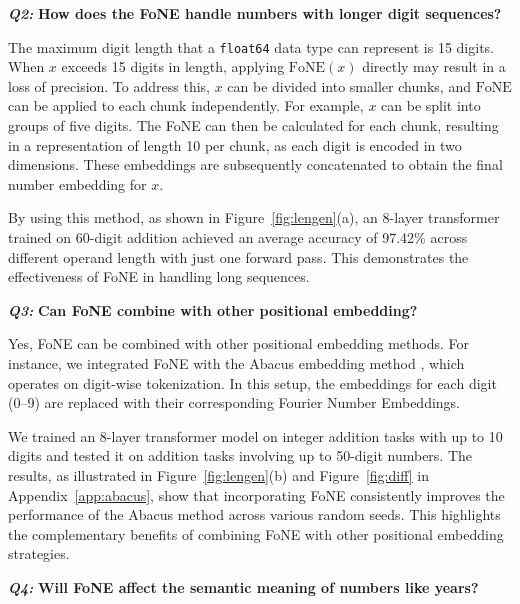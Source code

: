 \ifdefined\isarxiv
\vspace{3mm}
\fi
\noindent\textit{\textbf{Q2:}} \textbf{How does the FoNE handle numbers with longer digit sequences?}

The maximum digit length that a \texttt{float64} data type can represent is 15 digits. When \( x \) exceeds 15 digits in length, applying \( \text{FoNE}(x) \) directly may result in a loss of precision. To address this, \( x \) can be divided into smaller chunks, and \( \text{FoNE} \) can be applied to each chunk independently. For example, \( x \) can be split into groups of five digits. The FoNE can then be calculated for each chunk, resulting in a representation of length 10 per chunk, as each digit is encoded in two dimensions. These embeddings are subsequently concatenated to obtain the final number embedding for \( x \).

By using this method, as shown in Figure~\ref{fig:lengen}(a), an 8-layer transformer trained on 60-digit addition achieved an average accuracy of 97.42\% across different operand length with just one forward pass. This demonstrates the effectiveness of FoNE in handling long sequences.

\ifdefined\isarxiv
\vspace{3mm}
\fi
\noindent\textit{\textbf{Q3:}} \textbf{Can FoNE combine with other positional embedding?}

Yes, FoNE can be combined with other positional embedding methods. For instance, we integrated FoNE with the Abacus embedding method \cite{mcleish2024transformers}, which operates on digit-wise tokenization. In this setup, the embeddings for each digit (0--9) are replaced with their corresponding Fourier Number Embeddings.

We trained an 8-layer transformer model on integer addition tasks with up to 10 digits and tested it on addition tasks involving up to 50-digit numbers. The results, as illustrated in Figure~\ref{fig:lengen}(b) and Figure~\ref{fig:diff} in Appendix~\ref{app:abacus}, show that incorporating FoNE consistently improves the performance of the Abacus method across various random seeds. This highlights the complementary benefits of combining FoNE with other positional embedding strategies.

\ifdefined\isarxiv
\vspace{3mm}
\fi
\noindent\textit{\textbf{Q4:}} \textbf{Will FoNE affect the semantic meaning of numbers like years?}


